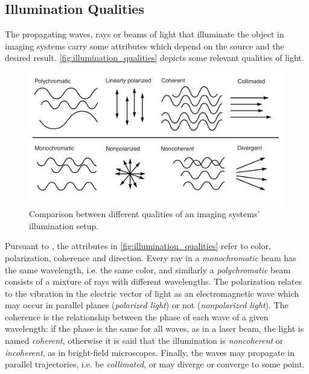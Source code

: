 \subsection{Illumination Qualities}

The propagating waves, rays or beams of light that illuminate the object in imaging systems carry some attributes which depend on the source and the desired result. \autoref{fig:illumination_qualities} depicts some relevant qualities of light. 


\begin{figure}[htb]
	\centering
	\caption{\label{fig:illumination_qualities} Comparison between different qualities of an imaging systems' illumination setup.}
	\begin{center}
	    \includegraphics[scale=0.4]{images/light_qualities.png}
	\end{center}
	\centering
\end{figure}

Pursuant to , the attributes in \autoref{fig:illumination_qualities} 
refer to color, polarization, coherence and direction. Every ray in a \emph{monochromatic} beam has the same wavelength, i.e. the same color, and similarly a \emph{polychromatic} beam consists of a mixture of rays with different wavelengths. The polarization relates to the vibration in the electric vector of light as an electromagnetic wave which may occur in parallel planes (\emph{polarized light}) or not (\emph{nonpolarized light}). The coherence is the relationship between the phase of each wave of a given wavelength: if the phase is the same for all waves, as in a laser beam, the light is named \emph{coherent}, otherwise it is said that the illumination is \emph{noncoherent} or \emph{incoherent}, as in bright-field microscopes. Finally, the waves may propagate in parallel trajectories, i.e. be \emph{collimated}, or may diverge or converge to some point.


